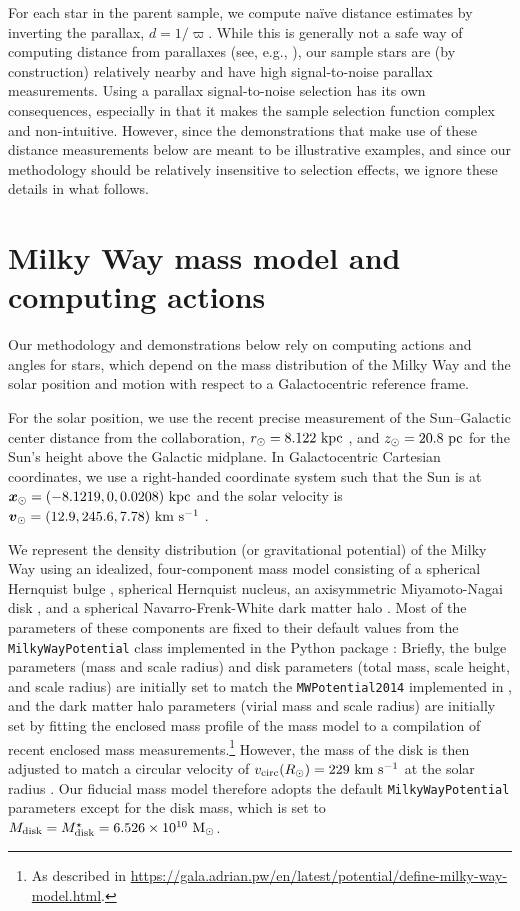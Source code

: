 \documentclass[modern]{aastex63}
\begin{document}
For each star in the parent sample, we compute na\"ive distance estimates by
inverting the parallax, $d = 1/\varpi$.
While this is generally not a safe way of computing distance from parallaxes
(see, e.g., \citealt{Bailer-Jones:2015}), our sample stars are (by construction)
relatively nearby and have high signal-to-noise parallax measurements.
Using a parallax signal-to-noise selection has its own consequences, especially
in that it makes the sample selection function complex and non-intuitive.
However, since the demonstrations that make use of these distance measurements
below are meant to be illustrative examples, and since our methodology should be
relatively insensitive to selection effects, we ignore these details in what
follows.


\section{Milky Way mass model and computing actions}
\label{sec:mw-model}

Our methodology and demonstrations below rely on computing actions and angles
for stars, which depend on the mass distribution of the Milky Way and the solar
position and motion with respect to a Galactocentric reference frame.

For the solar position, we use the recent precise measurement of the
Sun--Galactic center distance from the  collaboration, $r_\odot
= 8.122~\mathrm{kpc}$ \citep{Gravity:2018}, and $z_\odot = 20.8~\mathrm{pc}$
\citep{Bennett:2019} for the Sun's height above the Galactic midplane.
In Galactocentric Cartesian coordinates, we use a right-handed coordinate system
such that the Sun is at $\boldsymbol{x}_\odot = (-8.1219, 0, 0.0208)~\mathrm{kpc}$ and the solar
velocity is $\boldsymbol{v}_\odot = (12.9, 245.6, 7.78)~\mathrm{km}~\mathrm{s}^{-1}$ \citep{Drimmel:2018,
Reid:2004, Gravity:2018}.

We represent the density distribution (or gravitational potential) of the
Milky Way using an idealized, four-component mass model consisting of a
spherical Hernquist bulge \citep{Hernquist:1990}, spherical Hernquist nucleus,
an axisymmetric Miyamoto-Nagai disk \citep{Miyamoto:1975}, and a spherical
Navarro-Frenk-White dark matter halo \citep{Navarro:1996}.
Most of the parameters of these components are fixed to their default values
from the \texttt{MilkyWayPotential} class implemented in the 
Python package \citep[v1.1;][]{gala}:
Briefly, the bulge parameters (mass and scale radius) and disk parameters (total
mass, scale height, and scale radius) are initially set to match the
\texttt{MWPotential2014} implemented in  \citep{Bovy:2015}, and
the dark matter halo parameters (virial mass and scale radius) are initially set
by fitting the enclosed mass profile of the mass model to a compilation of
recent enclosed mass measurements.\footnote{As described in
\url{https://gala.adrian.pw/en/latest/potential/define-milky-way-model.html}.}
However, the mass of the disk is then adjusted to match a circular velocity of
$v_{\rm circ}(R_\odot) = 229~\mathrm{km}~\mathrm{s}^{-1}$ at the solar radius \citep{Eilers:2019}.
Our fiducial mass model therefore adopts the default \texttt{MilkyWayPotential}
parameters except for the disk mass, which is set to $M_{\rm disk} = M_{\rm
disk}^\star = 6.526 \times 10^{10}~\mathrm{M}_\odot$.
\end{document}
